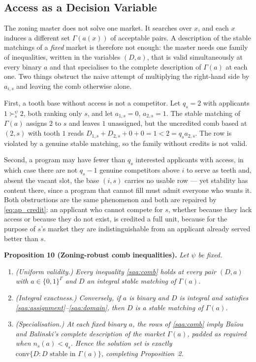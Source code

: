 \documentclass{article}
\begin{document}
\subsection{Access as a Decision Variable}
\label{app:ap_variable}

The zoning master does not solve one market. It searches over $x$, and each $x$ induces a different set $\Gamma(a(x))$ of acceptable pairs. A description of the stable matchings of a \emph{fixed} market is therefore not enough: the master needs one family of inequalities, written in the variables $(D,a)$, that is valid simultaneously at every binary $a$ and that specialises to the complete description of $\Gamma(a)$ at each one. Two things obstruct the naive attempt of multiplying the right-hand side by $a_{i,s}$ and leaving the comb otherwise alone.

First, a tooth base without access is not a competitor. Let $q_s = 2$ with applicants $1 \succ_s^\psi 2$, both ranking only $s$, and let $a_{1,s} = 0$, $a_{2,s} = 1$. The stable matching of $\Gamma(a)$ assigns $2$ to $s$ and leaves $1$ unassigned, but the uncredited comb based at $(2,s)$ with tooth $1$ reads $D_{1,s} + D_{2,s} + 0 + 0 = 1 < 2 = q_s a_{2,s}$. The row is violated by a genuine stable matching, so the family without credits is not valid.

Second, a program may have fewer than $q_s$ interested applicants with access, in which case there are not $q_s - 1$ genuine competitors above $i$ to serve as teeth and, absent the vacant slot, the base $(i,s)$ carries no usable row --- yet stability has content there, since a program that cannot fill must admit everyone who wants it. Both obstructions are the same phenomenon and both are repaired by \eqref{eq:ap_credit}: an applicant who cannot compete for $s$, whether because they lack access or because they do not exist, is credited a full unit, because for the purpose of $s$'s market they are indistinguishable from an applicant already served better than $s$.

\noindent\textbf{Proposition 10 (Zoning-robust comb inequalities).} \textit{Let $\psi$ be fixed.}
\begin{enumerate}
    \item[(i)] \textit{\emph{(Uniform validity.)} Every inequality \eqref{saa:comb} holds at every pair $(D,a)$ with $a \in \{0,1\}^{\Gamma}$ and $D$ an integral stable matching of $\Gamma(a)$.}
    \item[(ii)] \textit{\emph{(Integral exactness.)} Conversely, if $a$ is binary and $D$ is integral and satisfies \eqref{saa:assignment}--\eqref{saa:domain}, then $D$ is a stable matching of $\Gamma(a)$.}
    \item[(iii)] \textit{\emph{(Specialisation.)} At each fixed binary $a$, the rows of \eqref{saa:comb} imply Baïou and Balinski's complete description of the market $\Gamma(a)$, padded as required when $n_s(a) < q_s$. Hence the solution set is exactly $\mathrm{conv}\{D : D \text{ stable in } \Gamma(a)\}$, completing Proposition~2.}
\end{enumerate}
\end{document}
